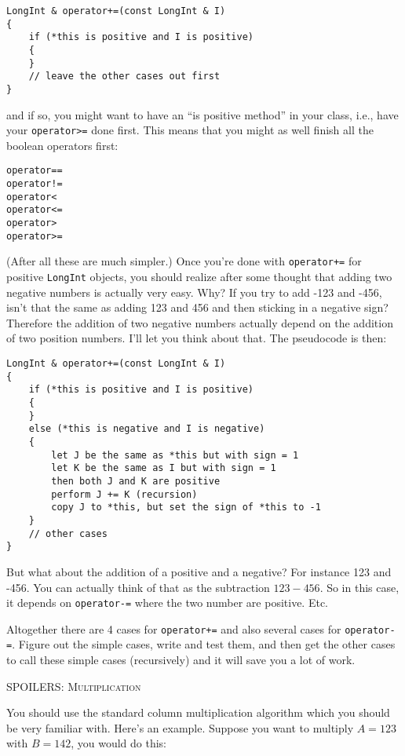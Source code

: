 \begin{Verbatim}[frame=single,fontsize=\footnotesize]
LongInt & operator+=(const LongInt & I)
{
    if (*this is positive and I is positive)
    {
    }
    // leave the other cases out first
}
\end{Verbatim}
and if so, you might want to have an “is positive method” in your class, 
i.e., have your \verb!operator>=! done first. This means that you might 
as well finish all the boolean operators first:
\begin{Verbatim}[frame=single,fontsize=\footnotesize]
operator==
operator!=
operator<
operator<=
operator>
operator>=
\end{Verbatim}
(After all these are much simpler.)
Once you're done with \verb!operator+=! for positive \verb!LongInt! objects, 
you should realize after some thought that adding two negative numbers is 
actually very easy. Why? If you try to add -123 and -456, isn't that the same 
as adding 123 and 456 and then sticking in a negative sign? Therefore the addition 
of two negative numbers actually depend on the addition of two position numbers. 
I'll let you think about that.
The pseudocode is then:
\begin{Verbatim}[frame=single,fontsize=\footnotesize]
LongInt & operator+=(const LongInt & I)
{
    if (*this is positive and I is positive)
    {
    }
    else (*this is negative and I is negative)
    {
        let J be the same as *this but with sign = 1
        let K be the same as I but with sign = 1
        then both J and K are positive
        perform J += K (recursion)
        copy J to *this, but set the sign of *this to -1
    }
    // other cases
}
\end{Verbatim}

But what about the addition of a positive and a 
negative? For instance 123 and -456. You can actually think of that as the subtraction 
$123 - 456$. So in this case, it depends on \verb!operator-=! where the two number are 
positive. Etc.

Altogether there are 4 cases for \verb!operator+=! and also several cases for \verb!operator-=!.
Figure out the simple cases, write and test them, and then
get the other cases to call these simple cases (recursively) and it will
save you a lot of work.


\newpage
\textsc{SPOILERS: Multiplication}

You should use the standard column multiplication algorithm which you should be very 
familiar with. Here's an example. Suppose you want to multiply $A = 123$ with $B = 142$, you would do this:

